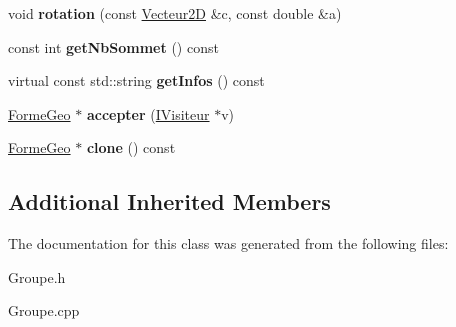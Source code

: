 \begin{DoxyCompactItemize}
void {\bfseries rotation} (const \mbox{\hyperlink{class_vecteur2_d}{Vecteur2D}} \&c, const double \&a)
\item 
\mbox{\label{class_groupe_a602c01a53f0e2b0bf36d495059c49dde}} 
const int {\bfseries get\+Nb\+Sommet} () const
\item 
\mbox{\label{class_groupe_ae4164192939d3993abbe6452cc18bef1}} 
virtual const std\+::string {\bfseries get\+Infos} () const
\item 
\mbox{\label{class_groupe_aa6878091480a71c4b83a8a7b7604b7ae}} 
\mbox{\hyperlink{class_forme_geo}{Forme\+Geo}} $\ast$ {\bfseries accepter} (\mbox{\hyperlink{class_i_visiteur}{I\+Visiteur}} $\ast$v)
\item 
\mbox{\label{class_groupe_a3625e87fa74c57ea8f8809d9203b6a9f}} 
\mbox{\hyperlink{class_forme_geo}{Forme\+Geo}} $\ast$ {\bfseries clone} () const
\end{DoxyCompactItemize}
\subsection*{Additional Inherited Members}


The documentation for this class was generated from the following files\+:\begin{DoxyCompactItemize}
\item 
Groupe.\+h\item 
Groupe.\+cpp\end{DoxyCompactItemize}
